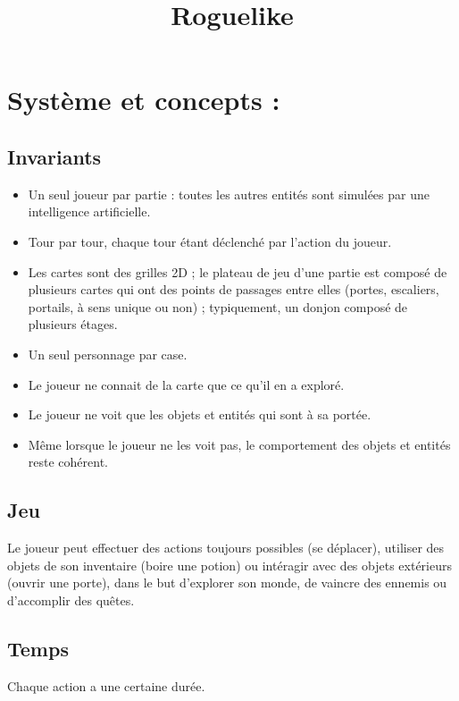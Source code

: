 \documentclass[french]{article}
\begin{document}
\title{Roguelike}

\maketitle

\section{Système et concepts :}


\subsection{Invariants}
\begin{itemize}
\item Un seul joueur par partie : toutes les autres entités sont simulées
par une intelligence artificielle.
\item Tour par tour, chaque tour étant déclenché par l'action du joueur.
\item Les cartes sont des grilles 2D ; le plateau de jeu d'une partie est
composé de plusieurs cartes qui ont des points de passages entre elles
(portes, escaliers, portails, à sens unique ou non) ; typiquement,
un donjon composé de plusieurs étages.
\item Un seul personnage par case.
\item Le joueur ne connait de la carte que ce qu'il en a exploré.
\item Le joueur ne voit que les objets et entités qui sont à sa portée.
\item Même lorsque le joueur ne les voit pas, le comportement des objets
et entités reste cohérent.
\end{itemize}

\subsection{Jeu}

Le joueur peut effectuer des actions toujours possibles (se déplacer),
utiliser des objets de son inventaire (boire une potion) ou intéragir
avec des objets extérieurs (ouvrir une porte), dans le but d'explorer
son monde, de vaincre des ennemis ou d'accomplir des quêtes.


\subsection{Temps }

Chaque action a une certaine durée.
\end{document}
